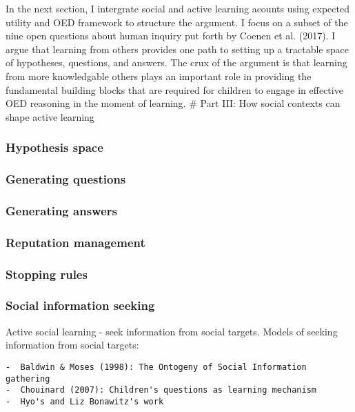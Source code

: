 \documentclass[a4paper,man,apacite,floatsintext]{apa6}
\begin{document}
In the next section, I intergrate social and active learning acounts
using expected utility and OED framework to structure the argument. I
focus on a subset of the nine open questions about human inquiry put
forth by Coenen et al. (2017). I argue that learning from others
provides one path to setting up a tractable space of hypotheses,
questions, and answers. The crux of the argument is that learning from
more knowledgable others plays an important role in providing the
fundamental building blocks that are required for children to engage in
effective OED reasoning in the moment of learning. \# Part III: How
social contexts can shape active learning

\subsubsection{Hypothesis space}\label{hypothesis-space}

\subsubsection{Generating questions}\label{generating-questions}

\subsubsection{Generating answers}\label{generating-answers}

\subsubsection{Reputation management}\label{reputation-management}

\subsubsection{Stopping rules}\label{stopping-rules}

\subsubsection{Social information
seeking}\label{social-information-seeking}

Active social learning - seek information from social targets. Models of
seeking information from social targets:

\begin{verbatim}
-  Baldwin & Moses (1998): The Ontogeny of Social Information gathering
-  Chouinard (2007): Children's questions as learning mechanism
-  Hyo's and Liz Bonawitz's work
\end{verbatim}
\end{document}

